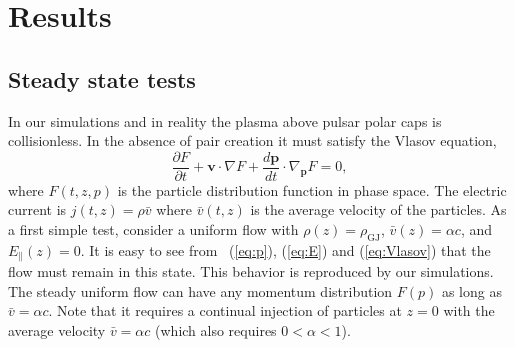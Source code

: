
\section{Results}


\subsection{Steady state tests}


In our simulations and in reality the plasma above pulsar polar caps is collisionless.
In the absence of pair creation it must satisfy
the Vlasov equation,
\begin{equation}
\label{eq:Vlasov}
    \frac{\partial F}{\partial t} + \mathbf{v}\cdot \nabla F + \frac{d\mathbf{p}}{dt}\cdot \nabla_\mathbf{p} F = 0,
\end{equation}
where $F(t,z,p)$ is the particle distribution function in phase space. The
electric current is $j(t,z)=\rho \bar{v}$ where $\bar{v}(t,z)$  is the average
velocity of the particles. As a first simple test, consider a uniform flow
with $\rho(z)=\rho_\mathrm{GJ}$, $\bar{v}(z)=\alpha c$, and $E_\parallel(z)=0$.
It is easy to see from \Eqs~(\ref{eq:p}), (\ref{eq:E}) and (\ref{eq:Vlasov}) that
the flow must remain in this state. This behavior is reproduced by our simulations.
The steady uniform flow can have any momentum distribution $F(p)$
as long as $\bar{v}=\alpha c$. Note that it requires a continual injection of particles
at $z=0$ with the average velocity $\bar{v}=\alpha c$ (which also requires $0<\alpha<1$).

